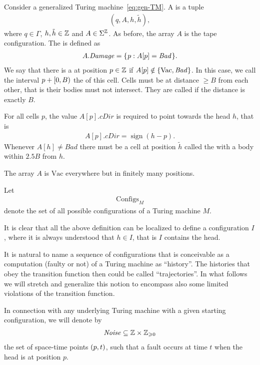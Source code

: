 \documentclass[12pt]{memoir}
\newcommand{\fld}[1]{\ensuremath{\textit{#1}}}
\newcommand{\sign}{\mathop\mathrm{sign}}
\def\B{B}
\newcommand{\Bad}{\mathit{Bad}}
\newcommand{\Configs}{\mathrm{Configs}}
\newcommand{\Damage}{\mathit{Damage}}
\newcommand{\h}{h}
\newcommand{\hc}{\tilde h}
\newcommand{\Noise}{\mathit{Noise}}
\newcommand{\cDir}{\fld{cDir}}
\newcommand{\Vacant}{\mathrm{Vac}}
\begin{document}
\begin{definition}[Configuration]\label{def:config}
     Consider a generalized Turing machine~\eqref{eq:gen-TM}.
    A  is a tuple
        \begin{align*}
             (q,A,\h,\hc),
        \end{align*}
    where \( q\in\Gamma \), \( \h,\hc\in\bbZ \) and \( A\in\Sigma^{\mathbb{Z}} \).
As before, the array \( A \) is the tape configuration.
The  is defined as
     \begin{align*}
          A.\Damage=\setOf{p}{A[p]=\Bad}.
     \end{align*}
We say that there is a  at position \( p\in\mathbb{Z} \) if
\( A[p]\notin \set{\Vacant, \Bad} \).
In this case, we call the interval \( p+\lint{0}{\B} \) the  of this cell.
Cells must be at distance \( \ge\B \) from each other, that is their
bodies must not intersect.
They are called  if the distance is exactly \( \B \).

For all cells \( p \), the value \( A[p].\cDir \) is required to point towards 
the head \( \h \), that is 
 \begin{align*}
   A[p].\cDir=\sign(\h-p).
 \end{align*}
Whenever \( A[\h]\neq \Bad \) there must be a
cell at position \( \hc \) called the  with a body 
within \( 2.5\B \) from \( \h \).

The array \( A \) is \( \Vacant \) everywhere but in finitely many positions.

Let
    \begin{align*}
         \Configs_{M}
    \end{align*}
    denote the set of all possible configurations
    of a Turing machine \( M \).

It is clear that all the above definition can be localized to define a configuration
 \( I \), where it is always understood that \( \h\in I \), that is 
\( I \) contains the head.
\end{definition}

It is natural to name a sequence of configurations that is conceivable as a computation
(faulty or not) of a Turing machine as ``history''.
The histories that obey the transition function then could be called ``trajectories''.
In what follows we will 
stretch and generalize this notion to encompass also some limited violations of the
transition function.

In connection with any underlying Turing machine with a given starting configuration, we will
denote by
\begin{align}\label{eq:noise-first}
   \Noise\subseteq \bbZ\times \bbZ_{\ge 0}
\end{align}
the set of space-time points \( (p,t) \), such that
a fault occurs at time \( t \) when the head is at position \( p \).
\end{document}
